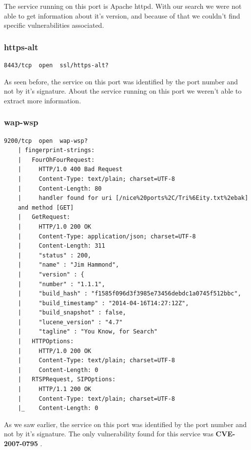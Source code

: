 The service running on this port is Apache httpd. With our search we were not able to get information about it's version, and because of that we couldn't find specific vulnerabilities associated.



\subsubsection{https-alt}

\begin{lstlisting}[basicstyle=\scriptsize]
    8443/tcp  open  ssl/https-alt?
\end{lstlisting}

As seen before, the service on this port was identified by the port number and not by it's signature. About the service running on this port we weren't able to extract more information.

\pagebreak

\subsubsection{wap-wsp}

\begin{lstlisting}[basicstyle=\scriptsize]
    9200/tcp  open  wap-wsp?
    | fingerprint-strings: 
    |   FourOhFourRequest: 
    |     HTTP/1.0 400 Bad Request
    |     Content-Type: text/plain; charset=UTF-8
    |     Content-Length: 80
    |     handler found for uri [/nice%20ports%2C/Tri%6Eity.txt%2ebak] 
    and method [GET]
    |   GetRequest: 
    |     HTTP/1.0 200 OK
    |     Content-Type: application/json; charset=UTF-8
    |     Content-Length: 311
    |     "status" : 200,
    |     "name" : "Jim Hammond",
    |     "version" : {
    |     "number" : "1.1.1",
    |     "build_hash" : "f1585f096d3f3985e73456debdc1a0745f512bbc",
    |     "build_timestamp" : "2014-04-16T14:27:12Z",
    |     "build_snapshot" : false,
    |     "lucene_version" : "4.7"
    |     "tagline" : "You Know, for Search"
    |   HTTPOptions: 
    |     HTTP/1.0 200 OK
    |     Content-Type: text/plain; charset=UTF-8
    |     Content-Length: 0
    |   RTSPRequest, SIPOptions: 
    |     HTTP/1.1 200 OK
    |     Content-Type: text/plain; charset=UTF-8
    |_    Content-Length: 0
\end{lstlisting}


As we saw earlier, the service on this port was identified by the port number and not by it's signature. The only vulnerability found for this service was \textbf{CVE-2007-0795} \cite{cve15}.

